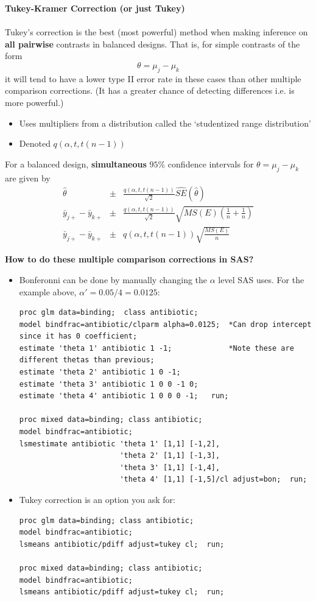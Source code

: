\newpage

\textbf{Tukey-Kramer Correction (or just Tukey)}\\~\\
Tukey's correction is the best (most powerful) method when making inference on \textbf{all pairwise} contrasts in balanced designs. That is, for simple contrasts of the form
$$ \theta=\mu_j-\mu_k$$
it will tend to have a lower type II error rate in these cases than other multiple comparison corrections.  (It has a greater chance of detecting differences i.e. is more powerful.)
\begin{itemize}
\item Uses multipliers from a distribution called the `studentized range distribution'
\item Denoted $q(\alpha,t,t(n-1))$
\end{itemize}
For a balanced design, {\bf simultaneous} $95\%$ confidence intervals for $\theta=\mu_j-\mu_k$ are given by
\begin{eqnarray*}
\hat{\theta}&\pm& \frac{q(\alpha,t,t(n-1))}{\sqrt{2}} \hat{SE}(\hat{\theta})\\
\bar{y}_{j+}-\bar{y}_{k+}&\pm& \frac{q(\alpha,t,t(n-1))}{\sqrt{2}}\sqrt{MS(E)\left(\frac{1}{n}+\frac{1}{n}\right)}\\
\bar{y}_{j+}-\bar{y}_{k+}&\pm& q(\alpha,t,t(n-1))\sqrt{\frac{MS(E)}{n}}
\end{eqnarray*}

\textbf{How to do these multiple comparison corrections in SAS?}
\begin{itemize}
\item Bonferonni can be done by manually changing the $\alpha$ level SAS uses.  For the example above, $\alpha'=0.05/4=0.0125$:
\begin{small}
\begin{verbatim}
proc glm data=binding;  class antibiotic;
model bindfrac=antibiotic/clparm alpha=0.0125;  *Can drop intercept since it has 0 coefficient;
estimate 'theta 1' antibiotic 1 -1;             *Note these are different thetas than previous;
estimate 'theta 2' antibiotic 1 0 -1;
estimate 'theta 3' antibiotic 1 0 0 -1 0;
estimate 'theta 4' antibiotic 1 0 0 0 -1;   run;

proc mixed data=binding; class antibiotic;
model bindfrac=antibiotic; 
lsmestimate antibiotic 'theta 1' [1,1] [-1,2],
                       'theta 2' [1,1] [-1,3],
                       'theta 3' [1,1] [-1,4],
                       'theta 4' [1,1] [-1,5]/cl adjust=bon;  run;
\end{verbatim}
\end{small}

\item Tukey correction is an option you ask for:
\begin{small}
\begin{verbatim}
proc glm data=binding; class antibiotic;
model bindfrac=antibiotic;
lsmeans antibiotic/pdiff adjust=tukey cl;  run;

proc mixed data=binding; class antibiotic;
model bindfrac=antibiotic;
lsmeans antibiotic/pdiff adjust=tukey cl;  run;
\end{verbatim}
\end{small}
\end{itemize}

